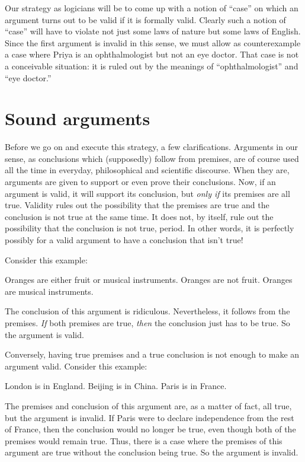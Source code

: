 Our strategy as logicians will be to come up with a notion of ``case'' on which an argument turns out to be valid if it is formally valid. Clearly such a notion of ``case'' will have to violate not just some laws of nature but some laws of English. Since the first argument is invalid in this sense, we must allow as counterexample a case where Priya is an ophthalmologist but not an eye doctor.  That case is not a conceivable situation: it is ruled out by the meanings of ``ophthalmologist'' and ``eye doctor.''


\section{Sound arguments}

Before we go on and execute this strategy, a few clarifications. Arguments in our sense, as conclusions which (supposedly) follow from premises, are of course used all the time in everyday, philosophical and scientific discourse. When they are, arguments are given to support or even prove their conclusions. Now, if an argument is valid, it will support its conclusion, but \emph{only if} its premises are all true. Validity rules out the possibility that the premises are true and the conclusion is not true at the same time. It does not, by itself, rule out the possibility that the conclusion is not true, period.  In other words, it is perfectly possibly for a valid argument to have a conclusion that isn't true!

Consider this example:
	\begin{earg}
		\prem Oranges are either fruit or musical instruments.
		\prem Oranges are not fruit.
		\conc Oranges are musical instruments.
	\end{earg}
The conclusion of this argument is ridiculous. Nevertheless, it follows from the premises. \emph{If} both premises are true, \emph{then} the conclusion just has to be true. So the argument is valid.

Conversely, having true premises and a true conclusion is not enough to make an argument valid. Consider this example:
	\begin{earg}
		\prem London is in England.
		\prem Beijing is in China.
		\conc Paris is in France.
	\end{earg}
The premises and conclusion of this argument are, as a matter of fact, all true, but the argument is invalid. If Paris were to declare independence from the rest of France, then the conclusion would no longer be true, even though both of the premises would remain true. Thus, there is a case where the premises of this argument are true without the conclusion being true. So the argument is invalid.

